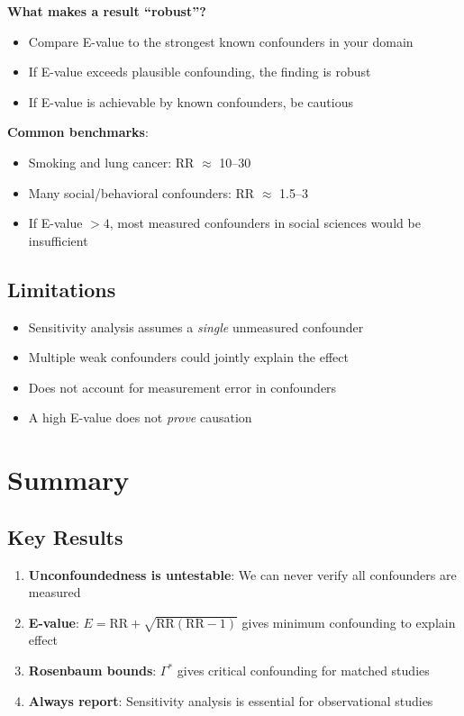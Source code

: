 \textbf{What makes a result ``robust''?}
\begin{itemize}
    \item Compare E-value to the strongest known confounders in your domain
    \item If E-value exceeds plausible confounding, the finding is robust
    \item If E-value is achievable by known confounders, be cautious
\end{itemize}

\textbf{Common benchmarks}:
\begin{itemize}
    \item Smoking and lung cancer: RR $\approx$ 10--30
    \item Many social/behavioral confounders: RR $\approx$ 1.5--3
    \item If E-value $> 4$, most measured confounders in social sciences would be insufficient
\end{itemize}

\subsection{Limitations}

\begin{itemize}
    \item Sensitivity analysis assumes a \emph{single} unmeasured confounder
    \item Multiple weak confounders could jointly explain the effect
    \item Does not account for measurement error in confounders
    \item A high E-value does not \emph{prove} causation
\end{itemize}

\section{Summary}
\label{sec:sens_summary}

\subsection{Key Results}

\begin{enumerate}
    \item \textbf{Unconfoundedness is untestable}: We can never verify all confounders are measured
    \item \textbf{E-value}: $E = \text{RR} + \sqrt{\text{RR}(\text{RR}-1)}$ gives minimum confounding to explain effect
    \item \textbf{Rosenbaum bounds}: $\Gamma^*$ gives critical confounding for matched studies
    \item \textbf{Always report}: Sensitivity analysis is essential for observational studies
\end{enumerate}

